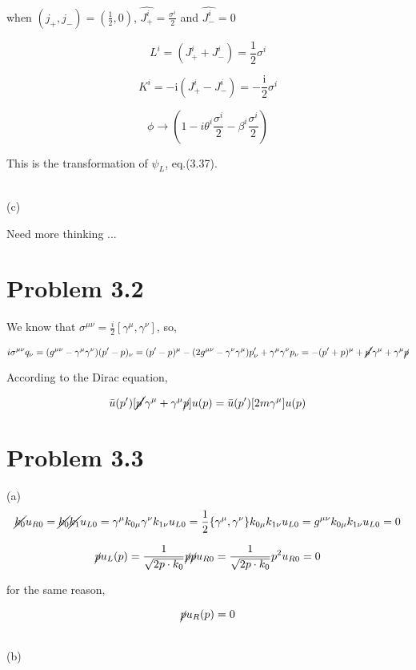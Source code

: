 \documentclass[11pt]{article} %
\begin{document}
when $(j_+, j_-) = (\frac{1}{2}, 0)$, $\hat{J_+^i} = \frac{\sigma^i}{2}$ and $\hat{J_-^i} = 0$

\[
    L^{i}=\left(J_{+}^{i}+J_{-}^{i}\right)=\frac{1}{2} \sigma^{i}    
\]

\[
    K^{i}=-\mathrm{i}\left(J_{+}^{i}-J_{-}^{i}\right)=-\frac{\mathrm{i}}{2} \sigma^{i}    
\]

\[
    \phi \to (1 - i \theta^i \frac{\sigma^i}{2} - \beta^i \frac{\sigma^i}{2})    
\]

This is the transformation of $\psi_L$, eq.(3.37).


~\\
\noindent (c)

Need more thinking ... 


\section{Problem 3.2}

We know that $\sigma^{\mu \nu} = \frac{i}{2}[\gamma^{\mu}, \gamma^{\nu}]$, so,

\[
    i \sigma^{\mu \nu} q_{\nu} = (g^{\mu \nu} - \gamma^{\mu} \gamma^{\nu}) (p' - p)_{\nu} = (p' - p)^{\mu} - (2 g^{\mu \nu} - \gamma^{\nu} \gamma^{\mu}) p'_{\nu} + \gamma^{\mu} \gamma^{\nu} p_{\nu} = -(p' + p)^{\mu} + \cancel{p'} \gamma^{\mu} + \gamma^{\mu} \cancel{p}
\]

According to the Dirac equation,

\[
    \bar{u}(p') [\cancel{p'} \gamma^{\mu} + \gamma^{\mu} \cancel{p}] u(p) = \bar{u}(p') [2m \gamma^{\mu}] u(p)
\]


\section{Problem 3.3}

\noindent (a)
\[
    \cancel{k_0} u_{R0} = \cancel{k_0} \cancel{k_1} u_{L0} = \gamma^\mu k_{0 \mu} \gamma^{\nu} k_{1 \nu} u_{L0} = \frac{1}{2} \{\gamma^\mu, \gamma^\nu\} k_{0 \mu} k_{1 \nu} u_{L0} = g^{\mu \nu} k_{0 \mu} k_{1 \nu} u_{L0} = 0    
\]

\[
    \cancel{p} u_{L}(p)=\frac{1}{\sqrt{2 p \cdot k_{0}}} \cancel{p} \cancel{p} u_{R 0}=\frac{1}{\sqrt{2 p \cdot k_{0}}} p^{2} u_{R 0}=0    
\]

for the same reason,

\[
    \cancel{p} u_{R}(p) = 0    
\]

~\\
\noindent (b)
\end{document}
